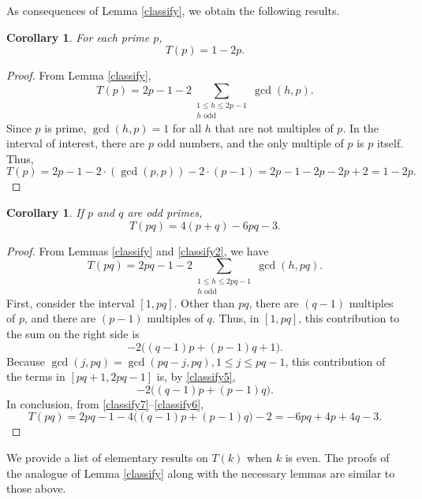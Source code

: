 \documentclass[11pt,reqno]{amsart}
\theoremstyle{plain}
\numberwithin{equation}{section}
\newtheorem{corollary}[theorem]{Corollary}
\begin{document}
As consequences of Lemma \ref{classify}, we obtain the following results.

\begin{corollary} For each prime $p$,
    $$T(p) = 1-2p.$$
\end{corollary}

\begin{proof} From Lemma \ref{classify},
 $$T(p)= 2p-1 - 2\sum\limits_{\substack{1\leq h \leq 2p - 1 \\ h \text{ odd}}}  \gcd(h,p).$$
Since $p$ is prime, $\gcd(h,p) = 1$ for all $h$ that are not multiples of $p$. In the interval of interest, there are $p$ odd numbers, and the only multiple of $p$ is $p$ itself. Thus,
$$
T(p) = 2p-1-2\cdot(\gcd(p,p)) - 2\cdot(p-1) = 2p-1-2p-2p+2 = 1-2p.
$$
\end{proof}

\begin{corollary} If $p$ and $q$ are odd primes,
    $$T(pq) = 4(p+q) - 6pq - 3.$$
\end{corollary}
\begin{proof} From Lemmas \ref{classify} and \ref{classify2}, we have
\begin{equation}\label{classify7}
T(pq)= 2pq-1 - 2\sum\limits_{\substack{1\leq h \leq 2pq- 1 \\ h \text{ odd}}}  \gcd(h,pq).
\end{equation}
First, consider the interval $[1,pq]$.  Other than $pq$, there are $(q-1)$ multiples of $p$, and there are $(p-1)$ multiples of $q$.  Thus, in $[1,pq]$, this contribution to the sum on the right side is
\begin{equation}\label{classify5}
-2\bigl((q-1)p+(p-1)q+1\bigr).
\end{equation}
Because $\gcd(j,pq)=\gcd(pq-j,pq), 1\leq j\leq pq-1$, this contribution of the terms in $[pq+1,2pq-1]$ is, by \eqref{classify5},
\begin{equation}\label{classify6}
-2\bigl((q-1)p+(p-1)q\bigr).
\end{equation}
In conclusion, from \eqref{classify7}--\eqref{classify6},
\begin{equation*}
T(pq)=2pq-1-4\bigl((q-1)p+(p-1)q\bigr)-2=-6pq+4p+4q-3.
\end{equation*}
\end{proof}



We provide a list of elementary results on $T(k)$ when $k$ is even.  The proofs of the analogue of Lemma \ref{classify} along with the necessary lemmas are similar to those above.
\end{document}
